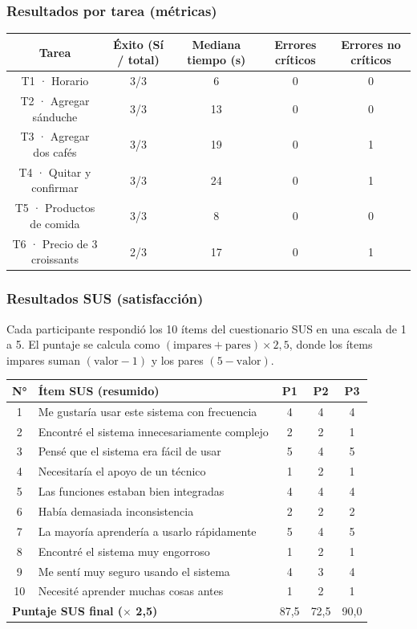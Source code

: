 \documentclass{article}
\begin{document}
\subsubsection{Resultados por tarea (métricas)}
\begin{center}
\small
\begin{tabular}{|c|c|c|c|c|}
\hline
\textbf{Tarea} & \textbf{Éxito (Sí / total)} & \textbf{Mediana tiempo (s)} & \textbf{Errores críticos} & \textbf{Errores no críticos} \\
\hline
T1 · Horario & 3/3 & 6 & 0 & 0 \\
\hline
T2 · Agregar sánduche & 3/3 & 13 & 0 & 0 \\
\hline
T3 · Agregar dos cafés & 3/3 & 19 & 0 & 1 \\
\hline
T4 · Quitar y confirmar & 3/3 & 24 & 0 & 1 \\
\hline
T5 · Productos de comida & 3/3 & 8 & 0 & 0 \\
\hline
T6 · Precio de 3 croissants & 2/3 & 17 & 0 & 1 \\
\hline
\end{tabular}
\end{center}

\subsubsection{Resultados SUS (satisfacción)}
Cada participante respondió los 10 ítems del cuestionario SUS en una escala de 1 a 5. El puntaje se calcula como $(\text{impares} + \text{pares}) \times 2{,}5$, donde los ítems impares suman $(\text{valor} - 1)$ y los pares $(5 - \text{valor})$.

\begin{center}
\small
\begin{tabular}{|c|p{6.2cm}|c|c|c|}
\hline
\textbf{N°} & \textbf{Ítem SUS (resumido)} & \textbf{P1} & \textbf{P2} & \textbf{P3} \\
\hline
1 & Me gustaría usar este sistema con frecuencia & 4 & 4 & 4 \\
\hline
2 & Encontré el sistema innecesariamente complejo & 2 & 2 & 1 \\
\hline
3 & Pensé que el sistema era fácil de usar & 5 & 4 & 5 \\
\hline
4 & Necesitaría el apoyo de un técnico & 1 & 2 & 1 \\
\hline
5 & Las funciones estaban bien integradas & 4 & 4 & 4 \\
\hline
6 & Había demasiada inconsistencia & 2 & 2 & 2 \\
\hline
7 & La mayoría aprendería a usarlo rápidamente & 5 & 4 & 5 \\
\hline
8 & Encontré el sistema muy engorroso & 1 & 2 & 1 \\
\hline
9 & Me sentí muy seguro usando el sistema & 4 & 3 & 4 \\
\hline
10 & Necesité aprender muchas cosas antes & 1 & 2 & 1 \\
\hline
\multicolumn{2}{|l|}{\textbf{Puntaje SUS final ($\times$ 2,5)}} & 87,5 & 72,5 & 90,0 \\
\hline
\end{tabular}
\end{center}
\end{document}
